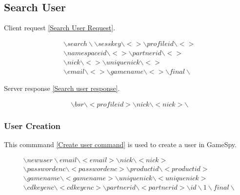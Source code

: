 \documentclass[oneside,titlepage,a4paper]{Definition/retrospy} %
\begin{document}
\subsection{Search User}
Client request \ref{Search User Request}.

\begin{tcolorbox}
	\begin{equation}\label{Search User Request}
	\begin{split}
	&\backslash search\backslash\backslash sesskey \backslash < >\backslash profileid \backslash < > \\ &\backslash namespaceid\backslash < >  \backslash partnerid\backslash < >\\
	& \backslash nick \backslash < > \backslash uniquenick \backslash < > \\ 
	&\backslash email \backslash < > \backslash gamename \backslash < > \backslash final \backslash
	\end{split}
	\end{equation}
\end{tcolorbox}

Server response \ref{Search user response}.

\begin{tcolorbox}
	\begin{equation}\label{Search user response}
	\begin{split}
&\backslash bsr \backslash < profileid > \backslash nick \backslash < nick > \backslash 
	\end{split}
	\end{equation}
\end{tcolorbox}

\subsubsection{User Creation}
This commmand \ref{Create user command} is used to create a user in GameSpy.
\begin{tcolorbox}
	\begin{equation}\label{Create user command}
	\begin{split}
	&\backslash newuser \backslash email \backslash < email > \backslash nick \backslash < nick > \\
	& \backslash passwordenc \backslash < passwordenc > 
	\backslash productid \backslash < productid > \\
	& \backslash gamename \backslash < gamename > \backslash uniquenick \backslash < uniquenick > \\
	& \backslash cdkeyenc \backslash < cdkeyenc > \backslash partnerid \backslash < partnerid > \backslash id \backslash 1 \backslash final \backslash
	\end{split}	
	\end{equation}
\end{tcolorbox}
\end{document}
